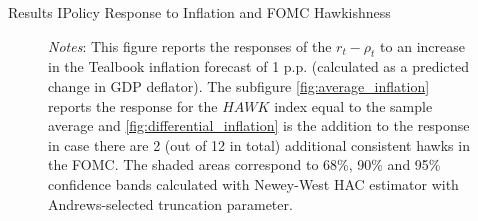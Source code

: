 \documentclass[11pt,pdf,aspectratio=129]{beamer}
\begin{document}
\begin{frame}{Results I}{Policy Response to Inflation and FOMC Hawkishness}
\begin{figure}[!htbp]
\begin{subfigure}[b]{0.48\textwidth}
        \end{subfigure}\vspace{-4ex}
            {\begin{flushleft}\tiny\textit{Notes}: This figure reports the responses of the $r_t-\rho_t$ to an increase in the Tealbook inflation forecast of 1 p.p. (calculated as a predicted change in GDP deflator). 
            The subfigure \ref{fig:average_inflation} reports the response for the $\mathit{HAWK}$ index equal to the sample average and \ref{fig:differential_inflation} is the addition to the response in case there are 2 (out of 12 in total) additional consistent hawks in the FOMC. The shaded areas correspond to 68\%, 90\% and 95\% confidence bands calculated with Newey-West HAC estimator with Andrews-selected truncation parameter.\end{flushleft}}
    \end{figure}
    
\end{frame}
\end{document}
